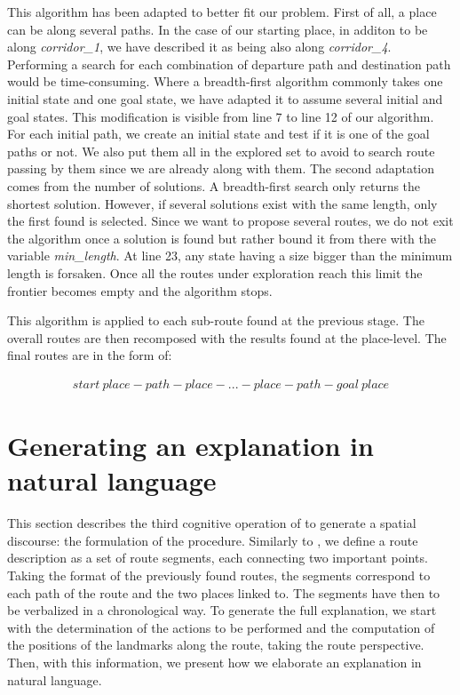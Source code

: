 This algorithm has been adapted to better fit our problem. First of all, a place can be along several paths. In the case of our starting place, in additon to be along \textit{corridor\_1}, we have described it as being also along \textit{corridor\_4}. Performing a search for each combination of departure path and destination path would be time-consuming. Where a breadth-first algorithm commonly takes one initial state and one goal state, we have adapted it to assume several initial and goal states. This modification is visible from line 7 to line 12 of our algorithm. For each initial path, we create an initial state and test if it is one of the goal paths or not. We also put them all in the explored set to avoid to search route passing by them since we are already along with them. The second adaptation comes from the number of solutions. A breadth-first search only returns the shortest solution. However, if several solutions exist with the same length, only the first found is selected. Since we want to propose several routes, we do not exit the algorithm once a solution is found but rather bound it from there with the variable \textit{min\_length}. At line 23, any state having a size bigger than the minimum length is forsaken. Once all the routes under exploration reach this limit the frontier becomes empty and the algorithm stops.

This algorithm is applied to each sub-route found at the previous stage. The overall routes are then recomposed with the results found at the place-level. The final routes are in the form of:

\begin{gather*}
start\ place - path - place - ... - place - path - goal\ place
\end{gather*}

\section{Generating an explanation in natural language}

This section describes the third cognitive operation of \cite{denis_1997_description} to generate a spatial discourse: the formulation of the procedure. Similarly to \cite{cassell_2007_trading}, we define a route description as a set of route segments, each connecting two important points. Taking the format of the previously found routes, the segments correspond to each path of the route and the two places linked to. The segments have then to be verbalized in a chronological way. To generate the full explanation, we start with the determination of the actions to be performed and the computation of the positions of the landmarks along the route, taking the route perspective. Then, with this information, we present how we elaborate an explanation in natural language.

